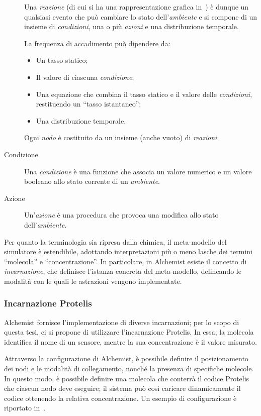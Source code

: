 \begin{description}
        Una \emph{reazione} (di cui si ha una rappresentazione grafica in~) è dunque un qualsiasi evento che può cambiare lo stato dell'\emph{ambiente} e si compone di un insieme di \emph{condizioni}, una o più \emph{azioni} e una distribuzione temporale.

        La frequenza di accadimento può dipendere da:
        \begin{itemize}
            \item Un tasso statico;
            \item Il valore di ciascuna \emph{condizione};
            \item Una equazione che combina il tasso statico e il valore delle \emph{condizioni}, restituendo un ``tasso istantaneo'';
            \item Una distribuzione temporale.
        \end{itemize}

        Ogni \emph{nodo} è costituito da un insieme (anche vuoto) di \emph{reazioni}.

      \item[Condizione]\label{itm:cond}
        Una \emph{condizione} è una funzione che associa un valore numerico e un valore booleano allo stato corrente di un \emph{ambiente}.

      \item[Azione]\label{itm:act}
        Un'\emph{azione} è una procedura che provoca una modifica allo stato dell'\emph{ambiente}.

    \end{description}

    Per quanto la terminologia sia ripresa dalla chimica, il meta-modello del simulatore è estendibile, adottando interpretazioni più o meno lasche dei termini ``molecola'' e ``concentrazione''.
    In particolare, in Alchemist esiste il concetto di \emph{incarnazione}, che definisce l'istanza concreta del meta-modello, delineando le modalità con le quali le astrazioni vengono implementate.

  \subsubsection{Incarnazione Protelis}

    Alchemist fornisce l'implementazione di diverse incarnazioni;
    per lo scopo di questa tesi, ci si propone di utilizzare l'incarnazione Protelis.
    In essa, la molecola identifica il nome di un sensore, mentre la sua concentrazione è il valore misurato.

    Attraverso la configurazione di Alchemist, è possibile definire il posizionamento dei nodi e le modalità di collegamento, nonché la presenza di specifiche molecole.
    In questo modo, è possibile definire una molecola che conterrà il codice Protelis che ciascun nodo deve eseguire;
    il sistema può così caricare dinamicamente il codice ottenendo la relativa concentrazione.
    Un esempio di configurazione è riportato in~.
